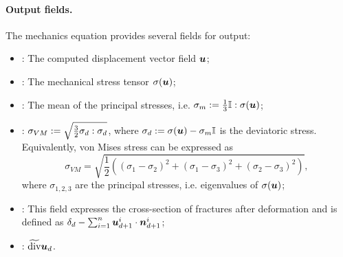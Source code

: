 \paragraph{Output fields.}
The mechanics equation provides several fields for output:
\begin{itemize}
    \item {}: The computed displacement vector field $\mathbf{\boldsymbol{u}}$;
    \item {}: The mechanical stress tensor ${\mathbb{\sigma}}(\mathbf{\boldsymbol{u}})$;
    \item {}: The mean of the principal stresses, i.e. $\sigma_m:=\frac13{\mathbb{I}}:{\mathbb{\sigma}}(\mathbf{\boldsymbol{u}})$;
    \item {}: $\sigma_{VM}:=\sqrt{\frac32{\mathbb{\sigma}}_d:{\mathbb{\sigma}}_d}$, where ${\mathbb{\sigma}}_d:={\mathbb{\sigma}}(\mathbf{\boldsymbol{u}})-\sigma_m{\mathbb{I}}$ is the deviatoric stress.
    Equivalently, von Mises stress can be expressed as
    \[ \sigma_{VM} = \sqrt{\frac12\left((\sigma_1-\sigma_2)^2+(\sigma_1-\sigma_3)^2+(\sigma_2-\sigma_3)^2\right)}, \]
    where $\sigma_{1,2,3}$ are the principal stresses, i.e. eigenvalues of ${\mathbb{\sigma}}(\mathbf{\boldsymbol{u}})$;
    \item {}: This field expresses the cross-section of fractures after deformation and is defined as $\delta_d-\sum_{i=1}^n\mathbf{\boldsymbol{u}}^i_{d+1}\cdot\mathbf{\boldsymbol{n}}^i_{d+1}$;
    \item {}: $\widetilde{\operatorname{div}}\mathbf{\boldsymbol{u}}_d$.
\end{itemize}

